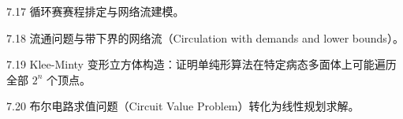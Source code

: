 \begin{exercise}{7.17}
循环赛赛程排定与网络流建模。
\end{exercise}

\begin{exercise}{7.18}
流通问题与带下界的网络流（Circulation with demands and lower bounds）。
\end{exercise}

\begin{exercise}{7.19}
Klee-Minty 变形立方体构造：证明单纯形算法在特定病态多面体上可能遍历全部 $2^n$ 个顶点。
\end{exercise}

\begin{exercise}{7.20}
布尔电路求值问题（Circuit Value Problem）转化为线性规划求解。
\end{exercise}
